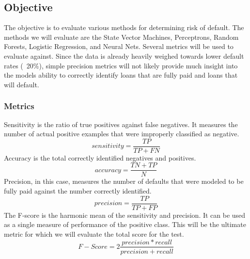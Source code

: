 \subsection{Objective}

The objective is to evaluate various methods for determining risk of default.  The methods we will evaluate are the State Vector Machines, Perceptrons, Random Forests, Logistic Regression, and Neural Nets. Several metrics will be used to evaluate against.  Since the data is already heavily weighed towards lower default rates (~20\%), simple precision metrics will not likely provide much insight into the models ability to correctly identify loans that are fully paid and loans that will default. 

\subsubsection{Metrics}
Sensitivity is the ratio of true positives against false negatives.  It measures the number of actual positive examples that were improperly classified as negative. 
\begin{equation}
sensitivity = \frac{TP}{TP + FN}
\end{equation}
Accuracy is the total correctly identified negatives and positives.  
\begin{equation}
accuracy = \frac{TN + TP}{N}
\end{equation}
Precision, in this case, measures the number of defaults that were modeled to be fully paid against the number correctly identified. 
\begin{equation}
precision = \frac{TP}{TP+FP}
\end{equation}
The F-score is the harmonic mean of the sensitivity and precision.  It can be used as a single measure of performance of the positive class. This will be the ultimate metric for which we will evaluate the total score for the test. 
\begin{equation}
F-Score = 2\frac{precision * recall}{precision + recall}
\end{equation}